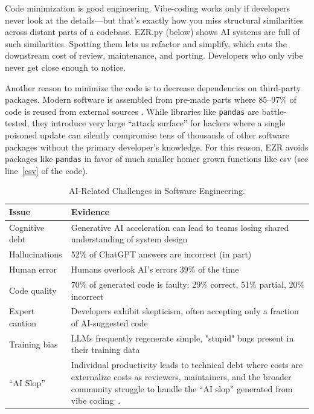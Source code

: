 Code minimization is good engineering. Vibe-coding works only if developers never look at the details—but that's exactly how you miss structural similarities across distant parts of a codebase. EZR.py (below) shows AI systems are full of such similarities. Spotting them lets us refactor and simplify, which cuts the downstream cost of review, maintenance, and porting. Developers who only vibe never get close enough to notice.

Another reason to minimize the code is to decrease  dependencies 
on third-party packages.   Modern software is   assembled from pre-made parts where 85--97\% of code is reused from external sources \cite{martinez2021}. While libraries like \texttt{pandas} are battle-tested, they introduce very large  ``attack surface'' for hackers
where a single poisoned update 
can silently compromise tens of thousands of other
software packages   without the 
primary developer's knowledge\cite{martinez2021}.
For this reason, EZR avoids packages like \texttt{pandas} in favor
of much smaller homer grown functions like \textsf{csv} (see line~\ref{csv} of the code).

\begin{table}[!b]
\caption{AI-Related Challenges in Software Engineering. }\label{problems}
\centering
\begin{tabular}{lp{6cm}}
\rowcolor{gray!20}\textbf{Issue} & \textbf{Evidence} \\\hline  
Cognitive debt & Generative AI acceleration can lead to teams
losing shared understanding of system design \cite{CognitiveDebt} \\
\rowcolor{gray!10}Hallucinations & 52\% of ChatGPT answers are incorrect (in part)\cite{S12} \\
Human error & Humans overlook AI's errors 39\% of the
time \cite{S12} \\
\rowcolor{gray!10}Code quality & 70\% of generated code is faulty: 29\% correct,
51\% partial, 20\% incorrect \cite{S15} \\
Expert caution & Developers exhibit skepticism, often accepting 
only a fraction of AI-suggested code \cite{S10} \\
\rowcolor{gray!10}Training bias & LLMs frequently regenerate simple, "stupid" bugs
present in their training data \cite{S13} \\
``AI Slop'' &   Individual productivity 
leads to technical debt\cite{S14} 
where costs are  externalize costs as  reviewers, maintainers, and the broader community
struggle to handle the ``AI slop''
generated from vibe coding~\cite{baltes2026anendlessstreamai}.
\end{tabular}

\end{table}


